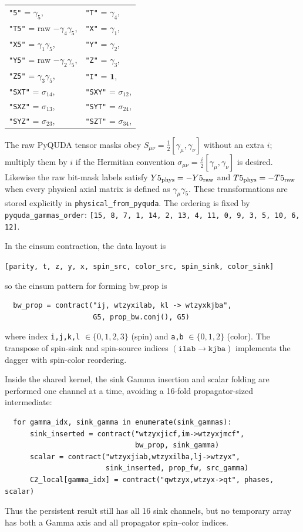 \documentclass[11pt,a4paper]{article}
\newcommand{\code}[1]{\texttt{#1}}
\begin{document}
{
\small
\begin{center}
\begin{tabular}{ll}
  \code{"5"} = $\gamma_5$, & \code{"T"} = $\gamma_4$, \\
  \code{"T5"} = raw $-\gamma_4\gamma_5$, & \code{"X"} = $\gamma_1$, \\
  \code{"X5"} = $\gamma_1\gamma_5$, & \code{"Y"} = $\gamma_2$, \\
  \code{"Y5"} = raw $-\gamma_2\gamma_5$, & \code{"Z"} = $\gamma_3$, \\
  \code{"Z5"} = $\gamma_3\gamma_5$, & \code{"I"} = $\mathbf{1}$, \\
  \code{"SXT"} = $\sigma_{14}$, & \code{"SXY"} = $\sigma_{12}$, \\
  \code{"SXZ"} = $\sigma_{13}$, & \code{"SYT"} = $\sigma_{24}$, \\
  \code{"SYZ"} = $\sigma_{23}$, & \code{"SZT"} = $\sigma_{34}$,
\end{tabular}
\end{center}
}

The raw PyQUDA tensor masks obey
$S_{\mu\nu}=\frac{1}{2}[\gamma_\mu,\gamma_\nu]$ without an extra $i$; multiply
them by $i$ if the Hermitian convention
$\sigma_{\mu\nu}=\frac{i}{2}[\gamma_\mu,\gamma_\nu]$ is desired.  Likewise the
raw bit-mask labels satisfy
$Y5_{\rm phys}=-Y5_{\rm raw}$ and
$T5_{\rm phys}=-T5_{\rm raw}$ when every physical axial matrix is defined as
$\gamma_\mu\gamma_5$.  These transformations are stored explicitly in
\code{physical\_from\_pyquda}. The ordering is fixed by \code{pyquda\_gammas\_order}:
\code{[15, 8, 7, 1, 14, 2, 13, 4, 11, 0, 9, 3, 5, 10, 6, 12]}.

In the einsum contraction, the data layout is
\begin{center}
\code{[parity, t, z, y, x, spin\_src, color\_src, spin\_sink, color\_sink]}
\end{center}
so the einsum pattern for forming $\text{bw\_prop}$ is
\begin{verbatim}
  bw_prop = contract("ij, wtzyxilab, kl -> wtzyxkjba",
                     G5, prop_bw.conj(), G5)
\end{verbatim}
where index \code{i,j,k,l} $\in \{0,1,2,3\}$ (spin) and \code{a,b} $\in \{0,1,2\}$ (color). The transpose of spin-sink and spin-source indices $(\texttt{ilab} \to \texttt{kjba})$ implements the dagger with spin-color reordering.

Inside the shared kernel, the sink Gamma insertion and scalar folding are
performed one channel at a time, avoiding a 16-fold propagator-sized
intermediate:
\begin{verbatim}
  for gamma_idx, sink_gamma in enumerate(sink_gammas):
      sink_inserted = contract("wtzyxjicf,im->wtzyxjmcf",
                               bw_prop, sink_gamma)
      scalar = contract("wtzyxjiab,wtzyxilba,lj->wtzyx",
                        sink_inserted, prop_fw, src_gamma)
      C2_local[gamma_idx] = contract("qwtzyx,wtzyx->qt", phases, scalar)
\end{verbatim}
Thus the persistent result still has all 16 sink channels, but no temporary
array has both a Gamma axis and all propagator spin--color indices.
\end{document}
